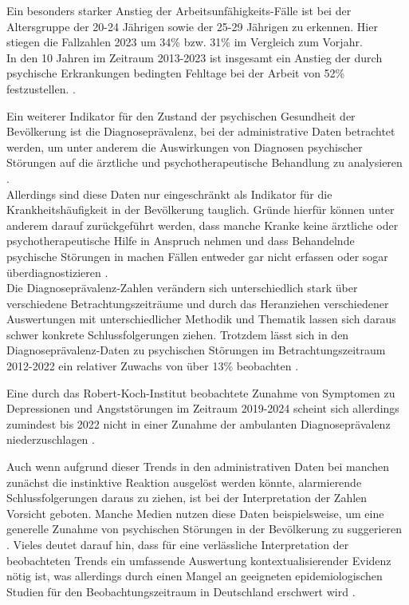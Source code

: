 Ein besonders starker Anstieg der Arbeitsunfähigkeits-Fälle ist bei der Altersgruppe der 20-24 Jährigen 
sowie der 25-29 Jährigen zu erkennen. Hier stiegen die Fallzahlen 2023 
um 34\% bzw. 31\% im Vergleich zum Vorjahr. \\
In den 10 Jahren im Zeitraum 2013-2023 ist insgesamt ein Anstieg 
der durch psychische Erkrankungen bedingten Fehltage bei der Arbeit von 52\% festzustellen. \parencite{latex:dak}. %

Ein weiterer Indikator für den Zustand der psychischen Gesundheit der Bevölkerung ist die Diagnoseprävalenz, 
bei der administrative Daten betrachtet werden, 
um unter anderem die Auswirkungen von Diagnosen psychischer Störungen auf die ärztliche und psychotherapeutische Behandlung zu analysieren \parencite{thom2024trends}. \\ %

Allerdings sind diese Daten nur eingeschränkt als Indikator für die Krankheitshäufigkeit in der Bevölkerung tauglich. 
Gründe hierfür können unter anderem darauf zurückgeführt werden, 
dass manche Kranke keine ärztliche oder psychotherapeutische Hilfe in Anspruch nehmen 
und dass Behandelnde psychische Störungen in machen Fällen entweder gar nicht erfassen 
oder sogar überdiagnostizieren \parencite{thom2024trends}. \\ %
Die Diagnoseprävalenz-Zahlen verändern sich unterschiedlich stark über verschiedene Betrachtungszeiträume und durch das Heranziehen verschiedener Auswertungen mit unterschiedlicher Methodik und Thematik lassen sich daraus schwer konkrete Schlussfolgerungen ziehen. Trotzdem lässt sich in den Diagnoseprävalenz-Daten zu psychischen Störungen im Betrachtungszeitraum 2012-2022 ein relativer Zuwachs von über 13\% beobachten \parencite{thom2024trends}. %

Eine durch das Robert-Koch-Institut beobachtete Zunahme von Symptomen zu Depressionen und Angststörungen im Zeitraum 2019-2024 \parencite{latex:rki} %
scheint sich allerdings zumindest bis 2022 nicht in einer Zunahme der ambulanten Diagnoseprävalenz niederzuschlagen \parencite{thom2024trends}. %


Auch wenn aufgrund dieser Trends in den administrativen Daten bei manchen zunächst die instinktive Reaktion ausgelöst werden könnte, alarmierende Schlussfolgerungen daraus zu ziehen, ist bei der Interpretation der Zahlen Vorsicht geboten.
Manche Medien nutzen diese Daten beispielsweise, um eine generelle Zunahme von psychischen Störungen in der Bevölkerung zu suggerieren \parencite{latex:nickels,latex:knollenborg}. %
Vieles deutet darauf hin, dass für eine verlässliche Interpretation der beobachteten Trends ein umfassende Auswertung kontextualisierender Evidenz nötig ist, was allerdings durch einen Mangel an geeigneten epidemiologischen Studien für den Beobachtungszeitraum in Deutschland erschwert wird \parencite{thom2024trends}. %


